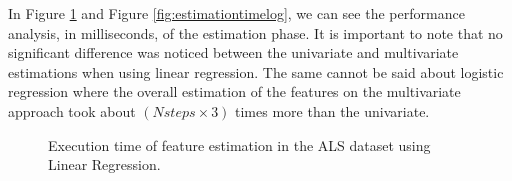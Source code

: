 In Figure \ref{fig:estimationtimelinear} and Figure \ref{fig:estimationtimelog}, we can see the performance analysis, in milliseconds, of the estimation
 phase. It is important to note that no significant difference was noticed between the univariate and multivariate estimations when using linear regression.
 The same cannot be said about logistic regression where the overall estimation of the features on the multivariate
approach took about $(N steps \times 3)$ times more than the univariate.

\begin{figure}[h]
	\begin{subfigmatrix}{2}
	\end{subfigmatrix}
	\caption{Execution time of feature estimation in the ALS dataset using Linear Regression.}
	\label{fig:estimationtimelinear}
\end{figure}

